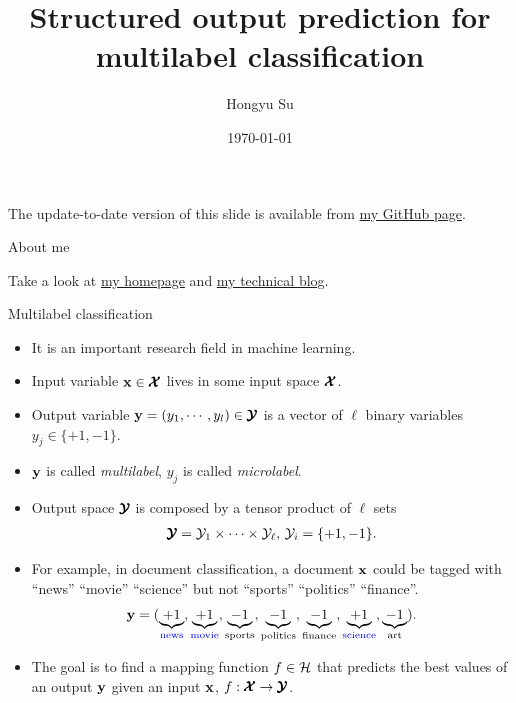\documentclass[first=dgreen,second=purple,logo=yellowexc]{aaltoslides}
\title{Structured output prediction for multilabel classification}
\author{Hongyu Su}
\institute[ICS]{
Helsinki Institute for Information Technology HIIT\\
Department of Computer Science, Aalto University
}
\date{ \today} %
\begin{document}
\aaltotitleframe
\footnotesize

%
\begin{frame}{}
	\begin{center}
		The update-to-date version of this slide is available from \href{https://github.com/hongyusu/Posters_and_Presentations/raw/master/Presentations/Seminar/example.pdf}{my GitHub page}.
	\end{center}
\end{frame}

\begin{frame}{About me}
	\begin{center}
		Take a look at \href{http://hongyusu.github.io}{my homepage} and \href{http://hongyusu.github.io/pages.html}{my technical blog}.
	\end{center}
\end{frame}

%
\begin{frame}{Multilabel classification}
	\begin{itemize}\footnotesize
		\item It is an important research field in machine learning.
		\item Input variable $\mathbf {x}\in\pmb {\mathcal{X}}$ lives in some input space $\pmb {\mathcal{X}}$.
		\item Output variable $\mathbf {y}=(y_1,\cdots,y_l)\in\pmb {\mathcal{Y}}$ is a vector of $\ell$ binary variables $y_j\in\{+1,-1\}$.
		\item $\mathbf {y}$ is called {\em multilabel}, $y_j$ is called {\em microlabel}.
		\item Output space $\pmb {\mathcal{Y}}$ is composed by a tensor product of $\ell$ sets
		\begin{align*}
			\pmb {\mathcal{Y}}=\mathcal{Y}_1\times\cdots\times\mathcal{Y}_{\ell},\,\mathcal{Y}_i=\{+1,-1\}.
		\end{align*}
		\item For example, in document classification, a document $\mathbf {x}$ could be tagged with {\blue``news'' ``movie'' ``science''} but not {``sports'' ``politics'' ``finance''}.
		\begin{align*}
\mathbf {y}=(\underbrace{+1}_{\color{blue}\text{news}},\underbrace{+1}_{\color{blue}\text{movie}},\underbrace{-1}_{\text{sports}},\underbrace{-1}_{\text{politics}},\underbrace{-1}_{\text{finance}},\underbrace{+1}_{\color{blue}\text{science}},\underbrace{-1}_{\text{art}}).
		\end{align*}\footnotesize
		\item The goal is to find a mapping function $f\in\mathcal{H}$ that predicts the best values of an output $\mathbf {y}$ given an input $\mathbf {x}$, $f:\pmb {\mathcal{X}}\rightarrow\pmb {\mathcal{Y}}$.
	\end{itemize}
\end{frame}
\end{document}
